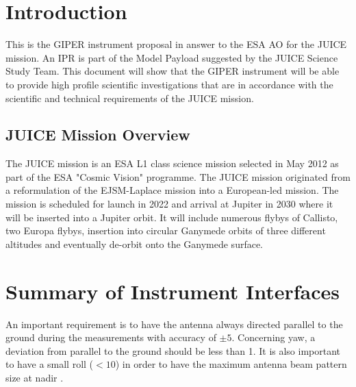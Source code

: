 \section{Introduction}
\label{sec:introduction}
%
This is the \ac{GIPER} instrument proposal in answer to the \ac{ESA} \ac{AO}\cite{JUICE_AO} for the \ac{JUICE} mission. An \ac{IPR} is part of the Model Payload suggested by the  JUICE Science Study Team\cite{yellowbook}. This document will show that the \ac{GIPER} instrument will be able to provide high profile scientific investigations that are in accordance with the scientific and technical requirements of the \ac{JUICE} mission.
%
\subsection{JUICE Mission Overview}
The \ac{JUICE} mission is an \ac{ESA} L1 class science mission selected in May 2012 as part of the \ac{ESA} "Cosmic Vision" programme. The \ac{JUICE} mission originated from a reformulation of the EJSM-Laplace mission into a European-led mission. The mission is scheduled for launch in 2022 and arrival at Jupiter in 2030 where it will be inserted into a Jupiter orbit. It will include numerous flybys of Callisto, two Europa flybys, insertion into circular Ganymede orbits of three different altitudes and eventually de-orbit onto the Ganymede surface. 
%
%
%

%
%

%
%
\section{Summary of Instrument Interfaces}
An important requirement is to have the antenna always directed parallel to the ground during the measurements with accuracy of $\pm 5$\textdegree. Concerning yaw, a deviation from parallel to the ground should be less than 1\textdegree. It is also important to have a small roll ($<10$\textdegree) in order to have the maximum antenna beam pattern size at nadir \cite{yellowbook}.
%
